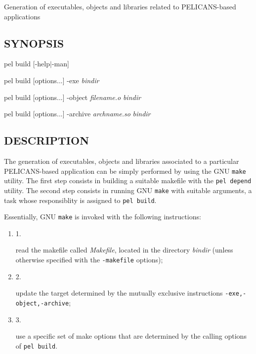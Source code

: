 \documentclass{article}
\begin{document}
Generation of executables, objects and libraries related to PELICANS-based applications

\subsection*{SYNOPSIS\label{build_SYNOPSIS}}


pel build [-help$|$-man]



pel build [options...] -exe \emph{bindir}



pel build [options...] -object \emph{filename.o} \emph{bindir}



pel build [options...] -archive \emph{archname.so} \emph{bindir}

\subsection*{DESCRIPTION\label{build_DESCRIPTION}}


The generation of executables, objects and libraries associated to
a particular PELICANS-based application can be simply performed by using
the GNU \texttt{make} utility. The first step consists in building
a suitable makefile with the \texttt{pel depend} utility. The second
step consists in running GNU \texttt{make}  with suitable arguments,
a task whose responsiblity is assigned to \texttt{pel build}.



Essentially, GNU \texttt{make} is invoked with the
following instructions:

\begin{enumerate}

\item 1.

read the makefile called \emph{Makefile}, located in the directory \emph{bindir}
(unless otherwise specified with the \texttt{-makefile} options);


\item 2.

update the target determined by the mutually exclusive instructions
\texttt{-exe,-object,-archive};


\item 3.

use a specific set of make options that are determined by
the calling options of \texttt{pel build}.

\end{enumerate}
\end{document}
